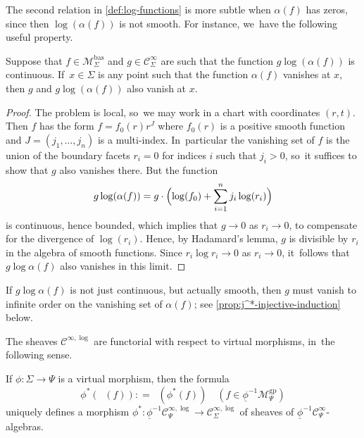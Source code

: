 \documentclass[10pt]{amsart}
\newcommand{\rBrac}[1]{\Bigl(#1\Bigr)}
\theoremstyle{definition}
\theoremstyle{remark}
\newenvironment{remark}
  {\pushQED{\qed}\renewcommand{\qedsymbol}{$\lozenge$}\remarkx}
  {\popQED\endremarkx}
\newcommand{\ulog}{\mathop{\widetilde{\log}}\nolimits}
\newcommand{\defas}{\mathrel{\mathop:}=}
\newcommand{\cMgp}{\mathscr{M}^{\mathrm{gp}}}
\newcommand{\cMbas}{\mathscr{M}^{\mathrm{bas}}}
\newcommand{\Cinf}[1]{\mathscr{C}^{\infty}_{#1}}
\newcommand{\Cinflog}[1]{\mathscr{C}^{\infty,\log}_{#1}}
\newcommand{\Sig}{\Sigma}
\newcommand{\uphi}{\underline{\phi}}
\begin{document}
The second relation in \autoref{def:log-functions} is more subtle when $\alpha(f)$ has zeros, since then $\log( \alpha(f))$ is not smooth. For instance, we~have the following useful property.

\begin{lemma}\label{lem:flat-times-log}
Suppose that $f \in \cMbas_\Sig$ and $g \in \Cinf{\Sig}$ are such that the function $g\log(\alpha(f))$ is continuous. If~$x \in \Sig$ is any point such that the function $\alpha(f)$ vanishes at $x$, then $g$ and $g\log(\alpha(f))$ also vanish at $x$.
\end{lemma}

\begin{proof}
The problem is local, so~we may work in a chart with coordinates $(r,t)$. Then $f$ has the form $f = f_0(r) r^J$ where $f_0(r)$ is a positive smooth function and $J =(j_1,\ldots,j_n)$ is a multi-index. In~particular the vanishing set of $f$ is the union of the boundary facets $r_i=0$ for indices $i$ such that $j_i> 0$, so~it suffices to show that $g$ also vanishes there. But the function
\[
g \log(\alpha(f)) = g \cdot \rBrac{\log(f_0) + \sum_{i=1}^n j_i \log(r_i)}
\]
is continuous, hence bounded, which implies that $g \to 0$ as $r_i \to 0$, to compensate for the divergence of $\log(r_i)$.
Hence, by Hadamard's lemma, $g$ is divisible by $r_i$ in the algebra of smooth functions. Since $r_i\log r_i \to 0$ as $r_i\rightarrow 0$, it~follows that $g\log\alpha(f)$ also vanishes in this limit.
\end{proof}
\begin{remark}
If $g \log \alpha(f)$ is not just continuous, but actually smooth, then $g$ must vanish to infinite order on the vanishing set of $\alpha(f)$; see \autoref{prop:j^*-injective-induction} below.
\end{remark}

The sheaves $\Cinflog{}$ are functorial with respect to virtual morphisms, in~the following sense.

\begin{lemma}\label{lem:functoriality-of-log-functions}
If $\phi\colon \Sig \to \Psi$ is a virtual morphism, then the formula
\[
\phi^*(\ulog(f))\defas\ulog(\phi^*(f)) \quad (f\in\uphi^{-1}\cMgp_\Psi)
\]
uniquely defines a morphism $\phi^*\colon \uphi^{-1}\Cinflog{\Psi} \to \Cinflog{\Sig}$ of sheaves of $\uphi^{-1}\Cinf{\Psi}$-algebras.
\end{lemma}
\end{document}
